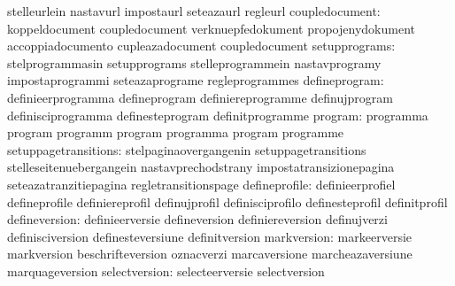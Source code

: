                                   stelleurlein                     nastavurl
                                  impostaurl                       seteazaurl
                                  regleurl
                  coupledocument: koppeldocument                   coupledocument
                                  verknuepfedokument               propojenydokument
                                  accoppiadocumento                cupleazadocument
                                  coupledocument
                   setupprograms: stelprogrammasin                 setupprograms
                                  stelleprogrammein                nastavprogramy
                                  impostaprogrammi                 seteazaprograme
                                  regleprogrammes
                   defineprogram: definieerprogramma               defineprogram
                                  definiereprogramme               definujprogram
                                  definisciprogramma               definesteprogram
                                  definitprogramme
                         program: programma                        program
                                  programm                         program
                                  programma                        program
                                  programme
            setuppagetransitions: stelpaginaovergangenin           setuppagetransitions
                                  stelleseitenuebergangein         nastavprechodstrany
                                  impostatransizionepagina         seteazatranzitiepagina
                                  regletransitionspage
                   defineprofile: definieerprofiel                 defineprofile
                                  definiereprofil                  definujprofil
                                  definisciprofilo                 definesteprofil
                                  definitprofil
                   defineversion: definieerversie                  defineversion
                                  definiereversion                 definujverzi
                                  definisciversion                 definesteversiune
                                  definitversion
                     markversion: markeerversie                    markversion
                                  beschrifteversion                oznacverzi
                                  marcaversione                    marcheazaversiune
                                  marquageversion
                   selectversion: selecteerversie                  selectversion
